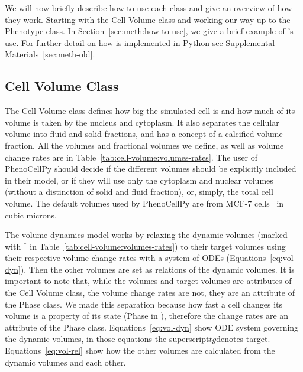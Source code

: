 
We will now briefly describe how to use each class and give an overview of how they work. Starting with the Cell Volume class and working our way up to the Phenotype class. In Section~\ref{sec:meth:how-to-use}, we give a brief example of \pcp's use. For further detail on how \pcp\space is implemented in Python see Supplemental Materials~\ref{sec:meth-old}. 

\subsection{Cell Volume Class}\label{sec:meth:vol}
The Cell Volume class defines how big the simulated cell is and how much of its volume is taken by the nucleus and cytoplasm. It also separates the cellular volume into fluid and solid fractions, and has a concept of a calcified volume fraction. All the volumes and fractional volumes we define, as well as volume change rates are in Table~\ref{tab:cell-volume:volumes-rates}. The user of PhenoCellPy should decide if the different volumes should be explicitly included in their model, or if they will use only the cytoplasm and nuclear volumes (without a distinction of solid and fluid fraction), or, simply, the total cell volume. The default volumes used by PhenoCellPy are from MCF-7 cells~\cite{noauthor_mcf-7_nodate} in cubic microns.


The volume dynamics model works by relaxing the dynamic volumes (marked with $^*$ in Table~\ref{tab:cell-volume:volumes-rates}) to their target volumes using their respective volume change rates with a system of ODEs (Equations~\ref{eq:vol-dyn}). Then the other volumes are set as relations of the dynamic volumes. It is important to note that, while the volumes and target volumes are attributes of the Cell Volume class, the volume change rates are not, they are an attribute of the Phase class. We made this separation because how fast a cell changes its volume is a property of its state (Phase in \pcp), therefore the change rates are an attribute of the Phase class. Equations~\ref{eq:vol-dyn} show ODE system governing the dynamic volumes, in those equations the superscript\space\space$tg$\space denotes target. Equations~\ref{eq:vol-rel} show how the other volumes are calculated from the dynamic volumes and each other.



